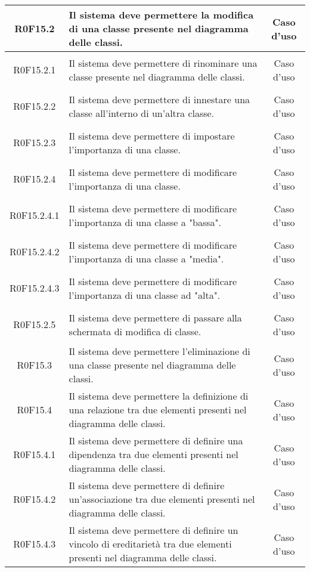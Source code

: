 \documentclass[../AnalisiDeiRequisiti.tex]{subfiles}
\begin{document}
\begin{longtable}{|c|>{\centering}p{7cm}|c|}
\hypertarget{R0F15.2}{R0F15.2} & Il sistema deve permettere la modifica di una classe presente nel diagramma delle classi. & Caso d'uso \\ \hline
\hypertarget{R0F15.2.1}{R0F15.2.1} & Il sistema deve permettere di rinominare una classe presente nel diagramma delle classi. & Caso d'uso \\ \hline
\hypertarget{R0F15.2.2}{R0F15.2.2} & Il sistema deve permettere di innestare una classe all'interno di un'altra classe. & Caso d'uso \\ \hline
\hypertarget{R0F15.2.3}{R0F15.2.3} & Il sistema deve permettere di impostare l'importanza di una classe. & Caso d'uso \\ \hline
\hypertarget{R0F15.2.4}{R0F15.2.4} & Il sistema deve permettere di modificare l'importanza di una classe. & Caso d'uso \\ \hline
\hypertarget{R0F15.2.4.1}{R0F15.2.4.1} & Il sistema deve permettere di modificare l'importanza di una classe a "bassa". & Caso d'uso \\ \hline
\hypertarget{R0F15.2.4.2}{R0F15.2.4.2} & Il sistema deve permettere di modificare l'importanza di una classe a "media". & Caso d'uso \\ \hline
\hypertarget{R0F15.2.4.3}{R0F15.2.4.3} & Il sistema deve permettere di modificare l'importanza di una classe ad "alta". & Caso d'uso \\ \hline
\hypertarget{R0F15.2.5}{R0F15.2.5} & Il sistema deve permettere di passare alla schermata di modifica di classe. & Caso d'uso \\ \hline
\hypertarget{R0F15.3}{R0F15.3} & Il sistema deve permettere l'eliminazione di una classe presente nel diagramma delle classi. & Caso d'uso \\ \hline
\hypertarget{R0F15.4}{R0F15.4} & Il sistema deve permettere la definizione di una relazione tra due elementi presenti nel diagramma delle classi. & Caso d'uso \\ \hline
\hypertarget{R0F15.4.1}{R0F15.4.1} & Il sistema deve permettere di definire una dipendenza tra due elementi presenti nel diagramma delle classi. & Caso d'uso \\ \hline
\hypertarget{R0F15.4.2}{R0F15.4.2} & Il sistema deve permettere di definire un'associazione tra due elementi presenti nel diagramma delle classi. & Caso d'uso \\ \hline
\hypertarget{R0F15.4.3}{R0F15.4.3} & Il sistema deve permettere di definire un vincolo di ereditarietà tra due elementi presenti nel diagramma delle classi. & Caso d'uso \\ \hline

\end{longtable}
\end{document}
